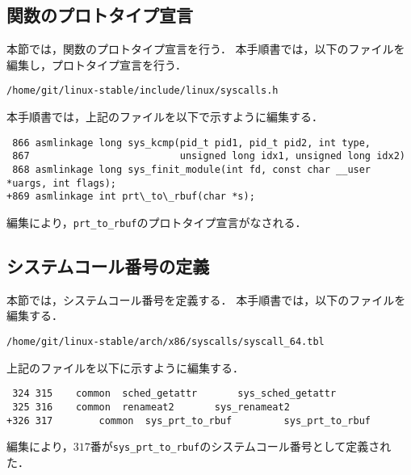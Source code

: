\documentclass[12pt]{jsarticle}
\begin{document}
\subsection{関数のプロトタイプ宣言}
本節では，関数のプロトタイプ宣言を行う．
本手順書では，以下のファイルを編集し，プロトタイプ宣言を行う．
\begin{verbatim}
/home/git/linux-stable/include/linux/syscalls.h
\end{verbatim}
本手順書では，上記のファイルを以下で示すように編集する．
\begin{verbatim}
 866 asmlinkage long sys_kcmp(pid_t pid1, pid_t pid2, int type,
 867                          unsigned long idx1, unsigned long idx2)
 868 asmlinkage long sys_finit_module(int fd, const char __user *uargs, int flags);
+869 asmlinkage int prt\_to\_rbuf(char *s);
\end{verbatim}
編集により，\verb|prt_to_rbuf|のプロトタイプ宣言がなされる．
\subsection{システムコール番号の定義}
本節では，システムコール番号を定義する．
本手順書では，以下のファイルを編集する．
\begin{verbatim}
/home/git/linux-stable/arch/x86/syscalls/syscall_64.tbl
\end{verbatim}
上記のファイルを以下に示すように編集する．
\begin{verbatim}
 324 315	common	sched_getattr		sys_sched_getattr
 325 316	common	renameat2		sys_renameat2
+326 317        common  sys_prt_to_rbuf         sys_prt_to_rbuf
\end{verbatim}
編集により，$317$番が\verb|sys_prt_to_rbuf|のシステムコール番号として定義された．
\end{document}
